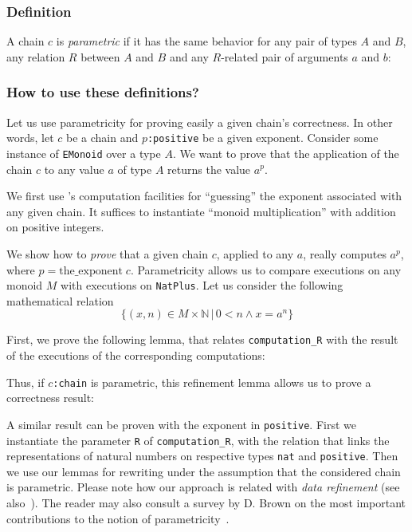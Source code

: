 \subsubsection{Definition}
A chain $c$ is \emph{parametric} if it has the same behavior for any
pair of types $A$  and $B$, any relation $R$
between  $A$ and $B$ and any $R$-related pair of 
arguments $a$ and $b$:


\subsubsection{How to use these definitions?}
Let us use parametricity for proving easily 
a given chain's correctness.
In other words, 
let $c$ be a chain and \texttt{$p$:positive} be a given exponent.
Consider some instance of \texttt{EMonoid} over a type $A$.
We want to prove that the application of the chain $c$ to 
any value $a$ of type $A$ returns the value \texttt{$a^p$}.

We first use \coq's computation facilities for ``guessing'' the exponent associated with any given chain. It suffices to instantiate ``monoid multiplication'' with addition on positive integers.


We show how to \emph{prove} that  a given  chain $c$,
applied to any $a$, really computes $a^p$, where $p=\textrm{the\_exponent}\;c$.
Parametricity allows us to compare executions on any monoid $M$ 
with executions on \texttt{NatPlus}.
Let us consider the following mathematical relation 
$$\{(x,n)\in M\times\mathbb{N}\,|\, 0<n \wedge x=a^n\}$$


First, we prove the following lemma, that relates \texttt{computation\_R}
with the result  of the  executions of the corresponding computations:


Thus, if \texttt{$c$:chain} is parametric, this refinement lemma allows us
to prove a correctness result:


A similar result can be proven with the exponent in \texttt{positive}.
First we instantiate the parameter \texttt{R} of \texttt{computation\_R},
with the relation that links the representations of natural numbers
on respective types \texttt{nat} and \texttt{positive}.
Then we use our lemmas for rewriting under the assumption that the
considered chain is parametric. Please note how our approach is related with
\emph{data refinement} (see also~\cite{Cohen2013}).
The reader may also consult a survey by D. Brown on the most important contributions to 
the notion of parametricity~\cite{DanBrown-survey}.

